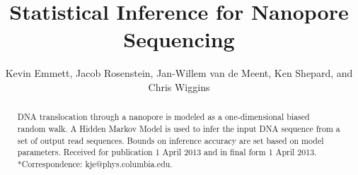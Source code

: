 \documentclass{biophys_letter}
\begin{document}
\setcounter{page}{1} %
\title{Statistical Inference for Nanopore Sequencing}

\author{Kevin Emmett,{\authdagger} Jacob Rosenstein, Jan-Willem van de Meent, Ken Shepard, and Chris Wiggins}

\address{{\addrdagger}Department of Physics and Department of Applied Physics and Applied Math, Columbia University, New York, New York; and School of Engineering, Brown University, Providence, Rhode Island}

\maketitle

\pagestyle{headings}



\begin{abstract}
{DNA translocation through a nanopore is modeled as a one-dimensional biased random walk. A Hidden Markov Model is used to infer the input DNA sequence from a set of output read sequences. Bounds on inference accuracy are set based on model parameters.}
{Received for publication 1 April 2013 and in final form 1 April 2013.}
{*Correspondence: kje@phys.columbia.edu.}
\end{abstract}

\vspace*{2.7pt}
\end{document}
